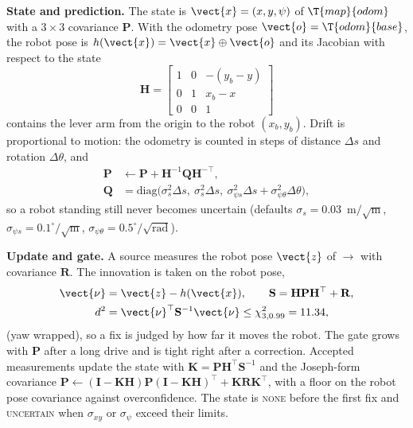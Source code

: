 \textbf{State and prediction.} The state is $\vect{x} = (x, y, \psi)$ of $\T{map}{odom}$ with a
$3\times3$ covariance $\mathbf{P}$. With the odometry pose $\vect{o} = \T{odom}{base}$, the
robot pose is $h(\vect{x}) = \vect{x} \oplus \vect{o}$ and its Jacobian with respect to the state
\begin{equation}
  \mathbf{H} = \begin{bmatrix} 1 & 0 & -(y_b - y) \\ 0 & 1 & x_b - x \\ 0 & 0 & 1 \end{bmatrix}
\end{equation}
contains the lever arm from the  origin to the robot $(x_b, y_b)$. Drift is
proportional to motion: the odometry is counted in steps of distance $\Delta s$ and rotation
$\Delta\theta$, and
\begin{equation}
  \begin{aligned}
    \mathbf{P} &\leftarrow \mathbf{P} + \mathbf{H}^{-1} \mathbf{Q} \mathbf{H}^{-\top},\\
    \mathbf{Q} &= \mathrm{diag}\big(\sigma_{s}^2 \Delta s,\ \sigma_{s}^2 \Delta s,\
    \sigma_{\psi s}^2 \Delta s + \sigma_{\psi\theta}^2 \Delta\theta\big),
  \end{aligned}
\end{equation}
so a robot standing still never becomes uncertain (defaults $\sigma_s = 0.03$~m$/\sqrt{\mathrm{m}}$,
$\sigma_{\psi s} = 0.1^\circ/\sqrt{\mathrm{m}}$, $\sigma_{\psi\theta} = 0.5^\circ/\sqrt{
\mathrm{rad}}$).

\textbf{Update and gate.} A source measures the robot pose $\vect{z}$ of $\to$
\frm{base\_link} with covariance $\mathbf{R}$. The innovation is taken on the robot pose,
\begin{equation}
  \begin{aligned}
    \vect{\nu} &= \vect{z} - h(\vect{x}), \qquad \mathbf{S} = \mathbf{H}\mathbf{P}\mathbf{H}^\top
    + \mathbf{R},\\
    d^2 &= \vect{\nu}^\top \mathbf{S}^{-1} \vect{\nu} \le \chi^2_{3,0.99} = 11.34,
  \end{aligned}
  \label{eq:gate}
\end{equation}
(yaw wrapped), so a fix is judged by how far it moves the robot. The gate grows with
$\mathbf{P}$ after a long drive and is tight right after a correction. Accepted measurements
update the state with $\mathbf{K} = \mathbf{P}\mathbf{H}^\top\mathbf{S}^{-1}$ and the
Joseph-form covariance $\mathbf{P} \leftarrow (\mathbf{I}-\mathbf{K}\mathbf{H})\mathbf{P}
(\mathbf{I}-\mathbf{K}\mathbf{H})^\top + \mathbf{K}\mathbf{R}\mathbf{K}^\top$, with a floor on
the robot pose covariance against overconfidence. The state is \textsc{none} before the first
fix and \textsc{uncertain} when $\sigma_{xy}$ or $\sigma_\psi$ exceed their limits.


